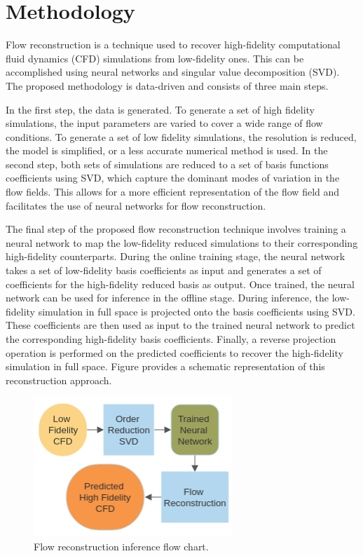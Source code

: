 \documentclass[10pt,oneside,a4paper,twocolumn]{article}
\begin{document}
\section{Methodology}

Flow reconstruction \cite{Yu2019} is a technique used to recover high-fidelity computational fluid dynamics (CFD) simulations from low-fidelity ones. This can be accomplished using neural networks and singular value decomposition (SVD). The proposed methodology is data-driven and consists of three main steps. 

In the first step, the data is generated. To generate a set of high fidelity simulations, the input parameters are varied to cover a wide range of flow conditions. To generate a set of low fidelity simulations, the resolution is reduced, the model is simplified, or a less accurate numerical method is used. In the second step, both sets of simulations are reduced to a set of basis functions coefficients using SVD, which capture the dominant modes of variation in the flow fields. This allows for a more efficient representation of the flow field and facilitates the use of neural networks for flow reconstruction.

The final step of the proposed flow reconstruction technique involves training a neural network to map the low-fidelity reduced simulations to their corresponding high-fidelity counterparts. During the online training stage, the neural network takes a set of low-fidelity basis coefficients as input and generates a set of coefficients for the high-fidelity reduced basis as output. Once trained, the neural network can be used for inference in the offline stage. During inference, the low-fidelity simulation in full space is projected onto the basis coefficients using SVD. These coefficients are then used as input to the trained neural network to predict the corresponding high-fidelity basis coefficients. Finally, a reverse projection operation is performed on the predicted coefficients to recover the high-fidelity simulation in full space. Figure  provides a schematic representation of this reconstruction approach.


\begin{figure}[h]
\centering
\includegraphics[width=0.8\columnwidth]{figures/inference.png}
\caption{Flow reconstruction inference flow chart.}
\label{fig:flow_chart}
\end{figure}
\end{document}
